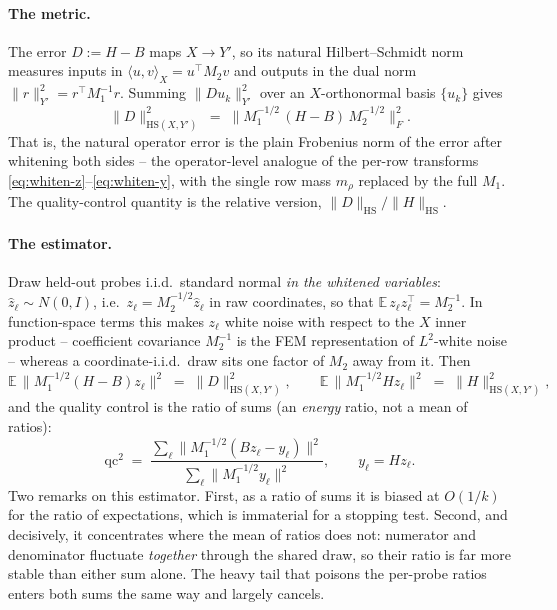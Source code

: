 \documentclass[11pt]{article}
\newcommand{\Mone}{M_1}
\newcommand{\Mtwo}{M_2}
\newcommand{\what}[1]{\widehat{#1}}
\begin{document}
\paragraph{The metric.} The error $D := H - B$ maps $X \to Y'$, so its natural
Hilbert--Schmidt norm measures inputs in $\langle u,v\rangle_X = u^\top \Mtwo
v$ and outputs in the dual norm $\|r\|_{Y'}^2 = r^\top \Mone^{-1} r$. Summing
$\|D u_k\|_{Y'}^2$ over an $X$-orthonormal basis $\{u_k\}$ gives
\begin{equation}
\|D\|_{\mathrm{HS}(X,Y')}^2
\;=\; \big\| \Mone^{-1/2}\, (H - B)\, \Mtwo^{-1/2} \big\|_F^2 .
\label{eq:hs-norm}
\end{equation}
That is, the natural operator error is the plain Frobenius norm of the error
after whitening both sides -- the operator-level analogue of the per-row
transforms \eqref{eq:whiten-z}--\eqref{eq:whiten-y}, with the single row mass
$m_\rho$ replaced by the full $\Mone$. The quality-control quantity is the
relative version, $\|D\|_{\mathrm{HS}} / \|H\|_{\mathrm{HS}}$.

\paragraph{The estimator.} Draw held-out probes i.i.d.\ standard normal
\emph{in the whitened variables}: $\what z_\ell \sim N(0, I)$, i.e.\ $z_\ell =
\Mtwo^{-1/2} \what z_\ell$ in raw coordinates, so that $\mathbb{E}\, z_\ell
z_\ell^\top = \Mtwo^{-1}$. In function-space terms this makes $z_\ell$ white
noise with respect to the $X$ inner product -- coefficient covariance
$\Mtwo^{-1}$ is the FEM representation of $L^2$-white noise -- whereas a
coordinate-i.i.d.\ draw sits one factor of $\Mtwo$ away from it. Then
\begin{equation}
\mathbb{E}\, \big\| \Mone^{-1/2} (H-B) z_\ell \big\|^2
\;=\; \|D\|_{\mathrm{HS}(X,Y')}^2 ,
\qquad
\mathbb{E}\, \big\| \Mone^{-1/2} H z_\ell \big\|^2
\;=\; \|H\|_{\mathrm{HS}(X,Y')}^2 ,
\end{equation}
and the quality control is the ratio of sums (an \emph{energy} ratio, not a
mean of ratios):
\begin{equation}
\mathrm{qc}^2 \;=\;
\frac{\sum_\ell \big\| \Mone^{-1/2} (B z_\ell - y_\ell) \big\|^2}
     {\sum_\ell \big\| \Mone^{-1/2} y_\ell \big\|^2},
\qquad y_\ell = H z_\ell .
\label{eq:qc-energy}
\end{equation}
Two remarks on this estimator. First, as a ratio of sums it is biased at
$O(1/k)$ for the ratio of expectations, which is immaterial for a stopping
test. Second, and decisively, it concentrates where the mean of ratios does
not: numerator and denominator fluctuate \emph{together} through the shared
draw, so their ratio is far more stable than either sum alone. The heavy tail
that poisons the per-probe ratios enters both sums the same way and largely
cancels.
\end{document}
